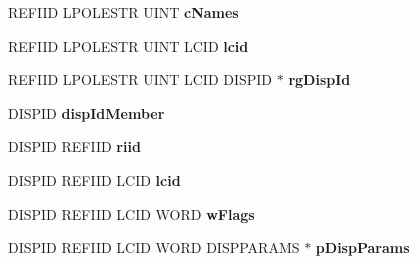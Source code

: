 \begin{DoxyCompactItemize}
\item 
\mbox{\label{struct_m_s_t_s_c_lib_1_1_i_ms_tsc_ax_vtbl_af3ac0addf72e8f741969f58090f4fe4c}} 
R\+E\+F\+I\+ID L\+P\+O\+L\+E\+S\+TR U\+I\+NT {\bfseries c\+Names}
\item 
\mbox{\label{struct_m_s_t_s_c_lib_1_1_i_ms_tsc_ax_vtbl_a7a2544d2f85adbe8b41b3d336c5e3891}} 
R\+E\+F\+I\+ID L\+P\+O\+L\+E\+S\+TR U\+I\+NT L\+C\+ID {\bfseries lcid}
\item 
\mbox{\label{struct_m_s_t_s_c_lib_1_1_i_ms_tsc_ax_vtbl_a7d2c0f3d4610fbd47c5605fd3db00a18}} 
R\+E\+F\+I\+ID L\+P\+O\+L\+E\+S\+TR U\+I\+NT L\+C\+ID D\+I\+S\+P\+ID $\ast$ {\bfseries rg\+Disp\+Id}
\item 
\mbox{\label{struct_m_s_t_s_c_lib_1_1_i_ms_tsc_ax_vtbl_a1ef8965e00c83aa2d3ba3263023a3514}} 
D\+I\+S\+P\+ID {\bfseries disp\+Id\+Member}
\item 
\mbox{\label{struct_m_s_t_s_c_lib_1_1_i_ms_tsc_ax_vtbl_ad189dc047c5660e5659020f076564786}} 
D\+I\+S\+P\+ID R\+E\+F\+I\+ID {\bfseries riid}
\item 
\mbox{\label{struct_m_s_t_s_c_lib_1_1_i_ms_tsc_ax_vtbl_a8d506c5f228d16ec6ecc12f93e046090}} 
D\+I\+S\+P\+ID R\+E\+F\+I\+ID L\+C\+ID {\bfseries lcid}
\item 
\mbox{\label{struct_m_s_t_s_c_lib_1_1_i_ms_tsc_ax_vtbl_aed8ec46c33f94d5367c1c2dc280f863c}} 
D\+I\+S\+P\+ID R\+E\+F\+I\+ID L\+C\+ID W\+O\+RD {\bfseries w\+Flags}
\item 
\mbox{\label{struct_m_s_t_s_c_lib_1_1_i_ms_tsc_ax_vtbl_ae28da150f8fea6e22712d04fd6ad0e2b}} 
D\+I\+S\+P\+ID R\+E\+F\+I\+ID L\+C\+ID W\+O\+RD D\+I\+S\+P\+P\+A\+R\+A\+MS $\ast$ {\bfseries p\+Disp\+Params}
\item 
\mbox{\label{struct_m_s_t_s_c_lib_1_1_i_ms_tsc_ax_vtbl_a87b160a23395769a034a81ab4aed42f9}} 

\end{DoxyCompactItemize}
